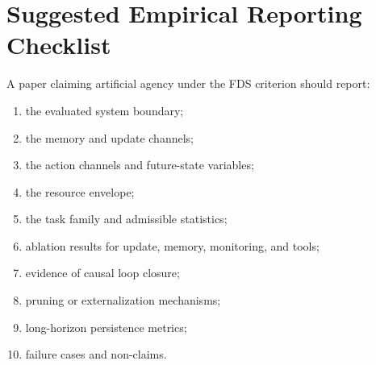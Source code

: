 \documentclass[10pt,a4paper,twocolumn,aps,prl]{revtex4-2}
\begin{document}
\section{Suggested Empirical Reporting Checklist}

A paper claiming artificial agency under the FDS criterion should report:
\begin{enumerate}[leftmargin=2em]
    \item the evaluated system boundary;
    \item the memory and update channels;
    \item the action channels and future-state variables;
    \item the resource envelope;
    \item the task family and admissible statistics;
    \item ablation results for update, memory, monitoring, and tools;
    \item evidence of causal loop closure;
    \item pruning or externalization mechanisms;
    \item long-horizon persistence metrics;
    \item failure cases and non-claims.
\end{enumerate}
\end{document}
